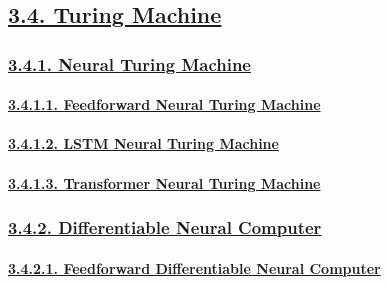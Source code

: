 \documentclass[
]{article}
\begin{document}
\hypertarget{turing-machine}{%
\subsection{\texorpdfstring{\protect\hyperlink{turing-machine-1}{3.4.
Turing Machine}}{3.4. Turing Machine}}\label{turing-machine}}

\hypertarget{neural-turing-machine}{%
\subsubsection{\texorpdfstring{\protect\hyperlink{neural-turing-machine-1}{3.4.1.
Neural Turing
Machine}}{3.4.1. Neural Turing Machine}}\label{neural-turing-machine}}

\hypertarget{feedforward-neural-turing-machine}{%
\paragraph{\texorpdfstring{\protect\hyperlink{feedforward-neural-turing-machine-1}{3.4.1.1.
Feedforward Neural Turing
Machine}}{3.4.1.1. Feedforward Neural Turing Machine}}\label{feedforward-neural-turing-machine}}

\hypertarget{lstm-neural-turing-machine}{%
\paragraph{\texorpdfstring{\protect\hyperlink{lstm-neural-turing-machine-1}{3.4.1.2.
LSTM Neural Turing
Machine}}{3.4.1.2. LSTM Neural Turing Machine}}\label{lstm-neural-turing-machine}}

\hypertarget{transformer-neural-turing-machine}{%
\paragraph{\texorpdfstring{\protect\hyperlink{transformer-neural-turing-machine-1}{3.4.1.3.
Transformer Neural Turing
Machine}}{3.4.1.3. Transformer Neural Turing Machine}}\label{transformer-neural-turing-machine}}

\hypertarget{differentiable-neural-computer}{%
\subsubsection{\texorpdfstring{\protect\hyperlink{differentiable-neural-computer-1}{3.4.2.
Differentiable Neural
Computer}}{3.4.2. Differentiable Neural Computer}}\label{differentiable-neural-computer}}

\hypertarget{feedforward-differentiable-neural-computer}{%
\paragraph{\texorpdfstring{\protect\hyperlink{feedforward-differentiable-neural-computer-1}{3.4.2.1.
Feedforward Differentiable Neural
Computer}}{3.4.2.1. Feedforward Differentiable Neural Computer}}\label{feedforward-differentiable-neural-computer}}
\end{document}
